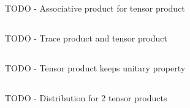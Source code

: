 \documentclass[a4paper,10pt]{hw}
\begin{document}
\subsection{}

TODO - Associative product for tensor product

\subsection{}

TODO - Trace product and tensor product

\subsection{}

TODO - Tensor product keeps unitary property

\subsection{}

TODO - Distribution for 2 tensor products
\end{document}
